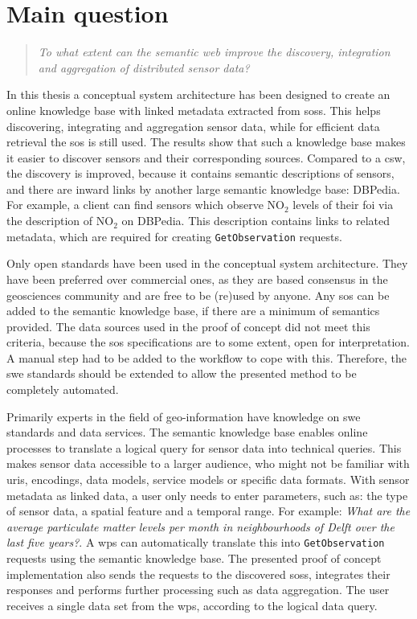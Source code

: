 \section{Main question}
\label{mainQuestion}
\begin{quote}
	\textit{To what extent can the semantic web improve the discovery, integration and aggregation of distributed sensor data?}%
\end{quote}

In this thesis a conceptual system architecture has been designed to create an online knowledge base with linked metadata extracted from \aclp{sos}. This helps discovering, integrating and aggregation sensor data, while for efficient data retrieval the \ac{sos} is still used. The results show that such a knowledge base makes it easier to discover sensors and their corresponding sources. Compared to a \ac{csw}, the discovery is improved, because it contains semantic descriptions of sensors, and there are inward links by another large semantic knowledge base: DBPedia. For example, a client can find sensors which observe NO$_{2}$ levels of their \ac{foi} via the description of NO$_{2}$ on DBPedia. This description contains links to related metadata, which are required for creating \texttt{GetObservation} requests.

Only open standards have been used in the conceptual system architecture. They have been preferred over commercial ones, as they are based consensus in the geosciences community and are free to be (re)used by anyone. Any \ac{sos} can be added to the semantic knowledge base, if there are a minimum of semantics provided. The data sources used in the proof of concept did not meet this criteria, because the \ac{sos} specifications are to some extent, open for interpretation. A manual step had to be added to the workflow to cope with this. Therefore, the \ac{swe} standards should be extended to allow the presented method to be completely automated. 

Primarily experts in the field of geo-information have knowledge on \ac{swe} standards and data services. The semantic knowledge base enables online processes to translate a logical query for sensor data into technical queries. This makes sensor data accessible to a larger audience, who might not be familiar with \acp{uri}, encodings, data models, service models or specific data formats. With sensor metadata as linked data, a user only needs to enter parameters, such as: the type of sensor data, a spatial feature and a temporal range. For example: \textit{What are the average particulate matter levels per month in neighbourhoods of Delft over the last five years?}. A \ac{wps} can automatically translate this into \texttt{GetObservation} requests using the semantic knowledge base. The presented proof of concept implementation also sends the requests to the discovered \aclp{sos}, integrates their responses and performs further processing such as data aggregation. The user receives a single data set from the \ac{wps}, according to the logical data query.   


